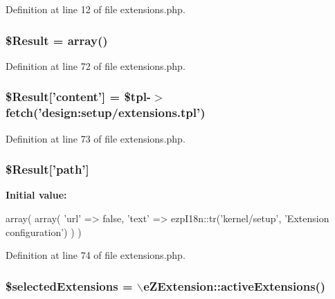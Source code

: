 Definition at line 12 of file extensions.\-php.

\hypertarget{extensions_8php_a390d5702f3c15330fd764dbf08d5b2db}{
\subsubsection[{\$\-Result}]{\setlength{\rightskip}{0pt plus 5cm}\$Result = array()}}\label{extensions_8php_a390d5702f3c15330fd764dbf08d5b2db}


Definition at line 72 of file extensions.\-php.

\hypertarget{extensions_8php_a0d32c70e3cf8c7b3fe5e4a499e9cd58f}{
\subsubsection[{\$\-Result}]{\setlength{\rightskip}{0pt plus 5cm}\$Result\mbox{[}'content'\mbox{]} = \$tpl-\/$>$fetch('design\-:setup/extensions.\-tpl')}}\label{extensions_8php_a0d32c70e3cf8c7b3fe5e4a499e9cd58f}


Definition at line 73 of file extensions.\-php.

\hypertarget{extensions_8php_a94a2cc5784adee982dec0235638f6251}{
\subsubsection[{\$\-Result}]{\setlength{\rightskip}{0pt plus 5cm}\$Result\mbox{[}'path'\mbox{]}}}\label{extensions_8php_a94a2cc5784adee982dec0235638f6251}
{\bfseries Initial value\-:}
\begin{DoxyCode}
 array(
                        array(
                            'url' => false,
                            'text' => ezpI18n::tr('kernel/setup', 'Extension
       configuration')
                        )
                )
\end{DoxyCode}


Definition at line 74 of file extensions.\-php.

\hypertarget{extensions_8php_adb784a735925c0ca3b600a1e0b1df50e}{
\subsubsection[{\$selected\-Extensions}]{\setlength{\rightskip}{0pt plus 5cm}\$selected\-Extensions = $\backslash$e\-Z\-Extension\-::active\-Extensions()}}\label{extensions_8php_adb784a735925c0ca3b600a1e0b1df50e}


